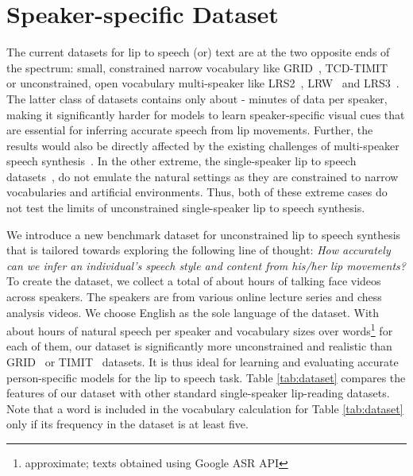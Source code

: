 \documentclass[10pt,twocolumn,letterpaper]{article}
\begin{document}
\section{Speaker-specific \modelname Dataset}
\label{section:dataset}

The current datasets for lip to speech (or) text are at the two opposite ends of the spectrum:  small, constrained narrow vocabulary like GRID~\cite{cooke2006audio}, TCD-TIMIT~\cite{harte2015tcd} or  unconstrained, open vocabulary multi-speaker like LRS2~\cite{Afouras2018DeepLR}, LRW~\cite{chung2016lip} and LRS3~\cite{afouras2018lrs3}. The latter class of datasets contains only about  -  minutes of data per speaker, making it significantly harder for models to learn speaker-specific visual cues that are essential for inferring accurate speech from lip movements. Further, the results would also be directly affected by the existing challenges of multi-speaker speech synthesis~\cite{gibiansky2017deep,jia2018transfer}. In the other extreme, the single-speaker lip to speech datasets~\cite{cooke2006audio,harte2015tcd}, do not emulate the natural settings as they are constrained to narrow vocabularies and artificial environments. Thus, both of these extreme cases do not test the limits of unconstrained single-speaker lip to speech synthesis. 

We introduce a new benchmark dataset for unconstrained lip to speech synthesis that is tailored towards exploring the following line of thought: \textit{How accurately can we infer an individual’s speech style and content from his/her lip movements?} To create the \modelname dataset, we collect a total of about  hours of talking face videos across  speakers. The speakers are from various online lecture series and chess analysis videos. We choose English as the sole language of the dataset. With about  hours of natural speech per speaker and vocabulary sizes over  words\footnote{approximate; texts obtained using Google ASR API} for each of them, our dataset is significantly more unconstrained and realistic than GRID~\cite{cooke2006audio} or TIMIT~\cite{harte2015tcd} datasets. It is thus ideal for learning and evaluating accurate person-specific models for the lip to speech task. Table \ref{tab:dataset} compares the features of our \modelname dataset with other standard single-speaker lip-reading datasets. Note that a word is included in the vocabulary calculation for Table \ref{tab:dataset} only if its frequency in the dataset is at least five.
\end{document}
